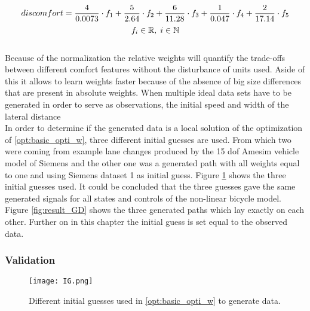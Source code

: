 \begin{equation}\label{eq:obj_ideal_data}
discomfort = \frac{4}{0.0073} \cdot f_1 +\frac{5}{2.64} \cdot f_2 +\frac{6}{11.28} \cdot f_3 +\frac{1}{0.047} \cdot f_4 +\frac{2}{17.14} \cdot f_5 \\
\end{equation}
\[	f_i \in \mathbb{R}, \hspace{1mm}
i \in \mathbb{N}\]\\

Because of the normalization the relative weights will quantify the trade-offs between different comfort features without the disturbance of units used. Aside of this it allows to learn weights faster because of the absence of big size differences that are present in absolute weights. When multiple ideal data sets have to be generated in order to serve as observations, the initial speed and width of the lateral distance \\
In order to determine if the generated data is a local solution of the optimization of \ref{opt:basic_opti_w}, three different initial guesses are used. From which two were coming from example lane changes produced by the 15 dof Amesim vehicle model of Siemens and the other one was a generated path with all weights equal to one and using Siemens dataset 1 as initial guess. Figure \ref{fig:IG} shows the three initial guesses used. It could be concluded that the three guesses gave the same generated signals for all states and controls of the non-linear bicycle model. Figure \ref{fig:result_GD} shows the three generated paths which lay exactly on each other. Further on in this chapter the initial guess is set equal to the observed data.

\subsubsection{Validation} \label{s:GD_val}




\begin{figure}[h!]
	\centering
	\texttt{[image: IG.png]}
	\caption{Different initial guesses used in \ref{opt:basic_opti_w} to generate data.}
	\label{fig:IG}
\end{figure}

